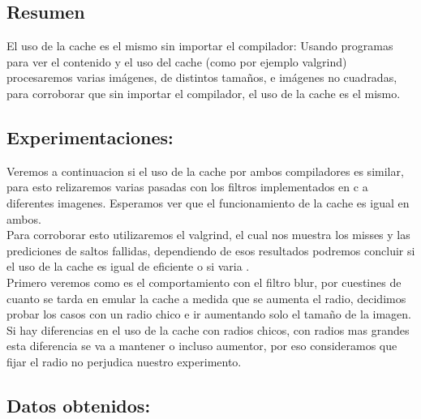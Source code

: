\subsection{Resumen}

El uso de la cache es el mismo sin importar el compilador: Usando programas para ver el contenido y el uso del cache (como por ejemplo valgrind) procesaremos varias imágenes, de distintos tamaños, e imágenes no cuadradas, para corroborar que sin importar el compilador, el uso de la cache es el mismo. \\


\subsection{Experimentaciones:}

Veremos a continuacion si el uso de la cache por ambos compiladores es similar, para esto relizaremos varias pasadas con los filtros implementados en c a diferentes imagenes. Esperamos ver que el funcionamiento de la cache es igual en ambos. \\

Para corroborar esto utilizaremos el valgrind, el cual nos muestra los misses y las  prediciones de saltos fallidas, dependiendo de esos resultados podremos concluir si el uso de la cache es igual de eficiente o si varia . \\

Primero veremos como es el comportamiento con el filtro blur, por cuestines de cuanto se tarda en emular la cache a medida que se aumenta el radio, decidimos probar los casos con un radio chico e ir aumentando solo el tamaño de la imagen. Si hay diferencias en el uso de la cache con radios chicos, con radios mas grandes esta diferencia se va a mantener o incluso aumentor, por eso consideramos que fijar el radio no perjudica nuestro experimento. \\

\subsection{Datos obtenidos:}

